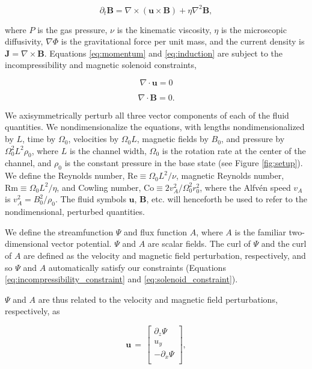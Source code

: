 \documentclass[twocolumn]{aastex61}
\newcommand{\beq}{\begin{equation}}
\newcommand{\eeq}{\end{equation}}
\newcommand\reye{\mathrm{Re}}
\newcommand\reym{\mathrm{Rm}}
\newcommand{\Co}{\mathrm{Co}}
\begin{document}
\beq\label{eq:induction}
\partial_t \mathbf{B} = \nabla \times \left(\mathbf{u} \times \mathbf{B}\right) + \eta\nabla^2\mathbf{B},
\eeq

where $P$ is the gas pressure, $\nu$ is the kinematic viscosity, $\eta$ is the microscopic diffusivity, $\nabla\Phi$ is the gravitational force per unit mass, and the current density is $\mathbf{J} = \nabla\times\mathbf{B}$.
Equations \ref{eq:momentum} and \ref{eq:induction} are subject to the incompressibility and magnetic solenoid constraints,

\beq\label{eq:incompressibility_constraint}
\nabla \cdot \mathbf{u} = 0
\eeq

\beq\label{eq:solenoid_constraint}
\nabla \cdot \mathbf{B} = 0.
\eeq


We axisymmetrically perturb all three vector components of each of the fluid quantities. We nondimensionalize the equations, with lengths nondimensionalized by $L$, time by $\Omega_0$, velocities by $\Omega_0 L$, magnetic fields by $B_0$, and pressure by $\Omega_0^2 L^2 \rho_0$, where $L$ is the channel width, $\Omega_0$ is the rotation rate at the center of the channel, and $\rho_0$ is the constant pressure in the base state (see Figure \ref{fig:setup}). We define the Reynolds number, $\reye \equiv {\Omega_0 L^2}/{\nu}$, magnetic Reynolds number, $\reym \equiv {\Omega_0 L^2}/{\eta}$, and Cowling number, $\Co \equiv {2 v_A^2}/{\Omega_0^2r_0^2}$, where the Alfv\'en speed $v_A$ is $v_A^2 = {B_0^2}/{\rho_0}$. The fluid symbols $\mathbf{u}$, $\mathbf{B}$, etc. will henceforth be used to refer to the nondimensional, perturbed quantities.

We define the streamfunction $\Psi$ and flux function $A$, where $A$ is the familiar two-dimensional vector potential. $\Psi$ and $A$ are scalar fields. The curl of $\Psi$ and the curl of $A$ are defined as the velocity and magnetic field perturbation, respectively, and so $\Psi$ and $A$ automatically satisfy our constraints (Equations \ref{eq:incompressibility_constraint} and \ref{eq:solenoid_constraint}).

$\Psi$ and $A$ are thus related to the velocity and magnetic field perturbations, respectively, as

\beq
\mathbf{u} \, = \, \left[\begin{matrix}
\partial_z \Psi \\
u_{y} \\
-\partial_x \Psi \\
\end{matrix}\right],\eeq
\end{document}
